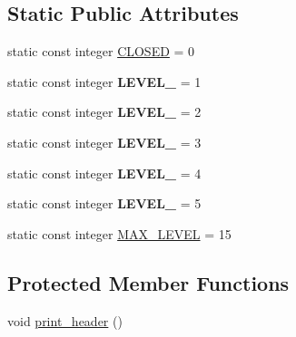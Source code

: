 \subsection*{Static Public Attributes}
\begin{DoxyCompactItemize}
\item 
static const integer \hyperlink{classez_1_1logging_1_1Logger_aa9ff03b52cf6bdc21b9e67086510d186}{C\+L\+O\+S\+ED} = 0
\item 
\mbox{\label{classez_1_1logging_1_1Logger_a5255b90ac8236f172ca5e68ca051cd92}} 
static const integer {\bfseries L\+E\+V\+E\+L\+\_} = 1
\item 
\mbox{\label{classez_1_1logging_1_1Logger_a39efb785fbecc012ec4b43acc7f6e87b}} 
static const integer {\bfseries L\+E\+V\+E\+L\+\_} = 2
\item 
\mbox{\label{classez_1_1logging_1_1Logger_ac010fadbb0dc962b7d51539a71ed8bfc}} 
static const integer {\bfseries L\+E\+V\+E\+L\+\_} = 3
\item 
\mbox{\label{classez_1_1logging_1_1Logger_aabfcb9853e1df58006702d7e5f0b581a}} 
static const integer {\bfseries L\+E\+V\+E\+L\+\_} = 4
\item 
\mbox{\label{classez_1_1logging_1_1Logger_a1c52e79139d2e5f1395e90ecae319332}} 
static const integer {\bfseries L\+E\+V\+E\+L\+\_} = 5
\item 
static const integer \hyperlink{classez_1_1logging_1_1Logger_a917e91166081de05403eba37ce05bdd5}{M\+A\+X\+\_\+\+L\+E\+V\+EL} = 15
\end{DoxyCompactItemize}
\subsection*{Protected Member Functions}
\begin{DoxyCompactItemize}
\item 
void \hyperlink{classez_1_1logging_1_1Logger_a13d4a164577e52950fc5b06508d9f158}{print\+\_\+header} ()
\end{DoxyCompactItemize}
